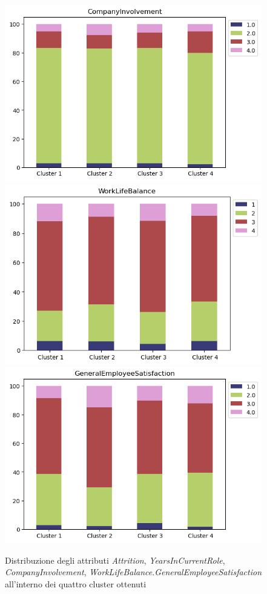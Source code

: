 \begin{figure}[htp]
\centering
		\includegraphics[width=.30\textwidth]{Immagini/KMeansCompanyInv.png}
		\includegraphics[width=.30\textwidth]{Immagini/KMeansWorkLife.png}
		\includegraphics[width=.30\textwidth]{Immagini/KMeansGeneralEmp.png}
		\caption{Distribuzione degli attributi \textit{Attrition}, \textit{YearsInCurrentRole}, \textit{CompanyInvolvement}, \textit{WorkLifeBalance}.\textit{GeneralEmployeeSatisfaction} all'interno dei quattro cluster ottenuti}
\end{figure}
